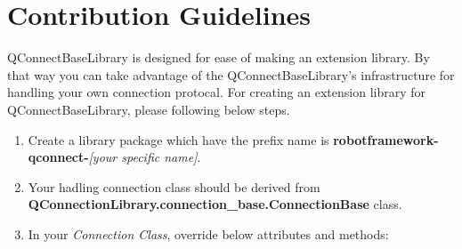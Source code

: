 \hypertarget{contribution-guidelines}{%
\section{Contribution Guidelines}\label{contribution-guidelines}}

QConnectBaseLibrary is designed for ease of making an extension library.
By that way you can take advantage of the QConnectBaseLibrary's
infrastructure for handling your own connection protocal. For creating
an extension library for QConnectBaseLibrary, please following below
steps.

\begin{enumerate}
\def\labelenumi{\arabic{enumi}.}
\tightlist
\item
  Create a library package which have the prefix name is
  \textbf{robotframework-qconnect-}\emph{{[}your specific name{]}}.
\item
  Your hadling connection class should be derived from
  \textbf{QConnectionLibrary.connection\_base.ConnectionBase} class.
\item
  In your \emph{Connection Class}, override below attributes and
  methods:
\end{enumerate}

